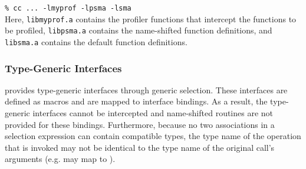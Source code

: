 \noindent\texttt{\% cc ... -lmyprof -lpsma -lsma} \\

Here, \texttt{libmyprof.a} contains the profiler functions that 
intercept the \openshmem functions to be profiled, 
\texttt{libpsma.a} contains the name-shifted \openshmem function 
definitions, and \texttt{libsma.a} contains the default \openshmem
function definitions. 

\subsubsection{\Cstd[11] Type-Generic Interfaces}
\label{sec:pshmem_c11_type_generic_interfaces}
\openshmem provides type-generic interfaces through \Cstd[11] 
generic selection. These interfaces are defined as macros 
and are mapped to \Cstd interface bindings. As a result, the 
\Cstd[11] type-generic interfaces cannot be intercepted and  
name-shifted  routines are not provided for these  
bindings. Furthermore, because no two associations in a \Cstd[11] 
 selection expression can contain compatible types, 
the type name of the \Cstd operation that is invoked may not be 
identical to the type name of the original call's arguments (e.g. 
 may map to ).
